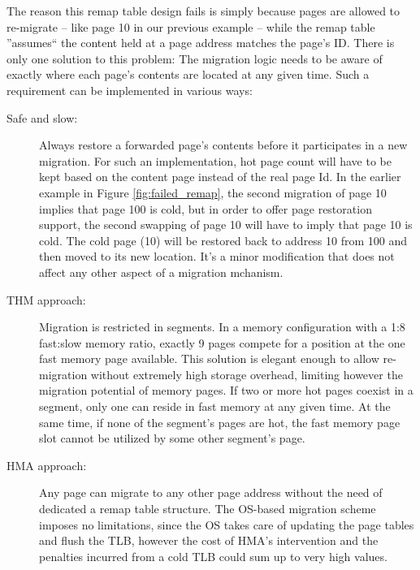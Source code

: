 The reason this remap table design fails is simply because pages are allowed to re-migrate -- like page 10 in our previous example -- while the remap table ''assumes`` the content held at a page address matches the page's ID.  There is only one solution to this problem: The migration logic needs to be aware of exactly where each page's contents are located at any given time. Such a requirement can be implemented in various ways:
\begin{description}
	\item[Safe and slow:] Always restore a forwarded page's contents before it participates in a new migration. For such an implementation, hot page count will have to be kept based on the content page instead of the real page Id. In the earlier example in Figure \ref{fig:failed_remap}, the second migration of page 10 implies that page 100 is cold, but in order to offer page restoration support, the second swapping of page 10 will have to imply that page 10 is cold. The cold page (10) will be restored back to address 10 from 100 and then moved to its new location. It's a minor modification that does not affect any other aspect of a migration mchanism.
	\item[THM approach:] Migration is restricted in segments. In a memory configuration with a 1:8 fast:slow memory ratio, exactly 9 pages compete for a position at the one fast memory page available. This solution is elegant enough to allow re-migration without extremely high storage overhead, limiting however the migration potential of memory pages. If two or more hot pages coexist in a segment, only one can reside in fast memory at any given time. At the same time, if none of the segment's pages are hot, the fast memory page slot cannot be utilized by some other segment's page.
	\item[HMA approach:] Any page can migrate to any other page address without the need of dedicated a remap table structure. The OS-based migration scheme imposes no limitations, since the OS takes care of updating the page tables and flush the TLB, however the cost of HMA's intervention and the penalties incurred from a cold TLB could sum up to very high values.

\end{description}
